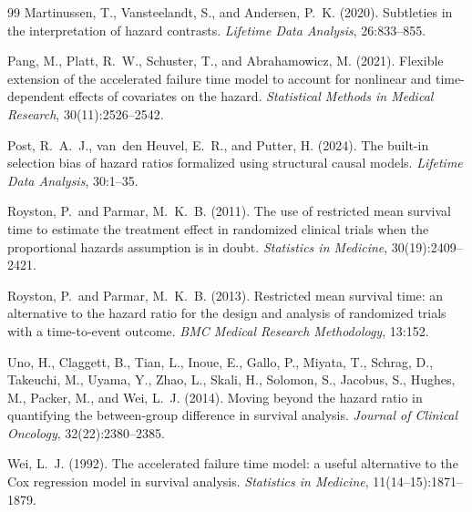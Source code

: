 \documentclass[11pt]{article}
\begin{document}
\begin{thebibliography}{99}
Martinussen, T., Vansteelandt, S., and Andersen, P.~K. (2020).
\newblock Subtleties in the interpretation of hazard contrasts.
\newblock \emph{Lifetime Data Analysis}, 26:833--855.

Pang, M., Platt, R.~W., Schuster, T., and Abrahamowicz, M. (2021).
\newblock Flexible extension of the accelerated failure time model to
account for nonlinear and time-dependent effects of covariates on the
hazard.
\newblock \emph{Statistical Methods in Medical Research}, 30(11):2526--2542.

Post, R.~A.~J., van~den Heuvel, E.~R., and Putter, H. (2024).
\newblock The built-in selection bias of hazard ratios formalized using
structural causal models.
\newblock \emph{Lifetime Data Analysis}, 30:1--35.

Royston, P.\ and Parmar, M.~K.~B. (2011).
\newblock The use of restricted mean survival time to estimate the
treatment effect in randomized clinical trials when the proportional
hazards assumption is in doubt.
\newblock \emph{Statistics in Medicine}, 30(19):2409--2421.

Royston, P.\ and Parmar, M.~K.~B. (2013).
\newblock Restricted mean survival time: an alternative to the hazard
ratio for the design and analysis of randomized trials with a
time-to-event outcome.
\newblock \emph{BMC Medical Research Methodology}, 13:152.

Uno, H., Claggett, B., Tian, L., Inoue, E., Gallo, P., Miyata, T.,
Schrag, D., Takeuchi, M., Uyama, Y., Zhao, L., Skali, H., Solomon, S.,
Jacobus, S., Hughes, M., Packer, M., and Wei, L.~J. (2014).
\newblock Moving beyond the hazard ratio in quantifying the between-group
difference in survival analysis.
\newblock \emph{Journal of Clinical Oncology}, 32(22):2380--2385.

Wei, L.~J. (1992).
\newblock The accelerated failure time model: a useful alternative to the
Cox regression model in survival analysis.
\newblock \emph{Statistics in Medicine}, 11(14--15):1871--1879.

\end{thebibliography}
\end{document}
